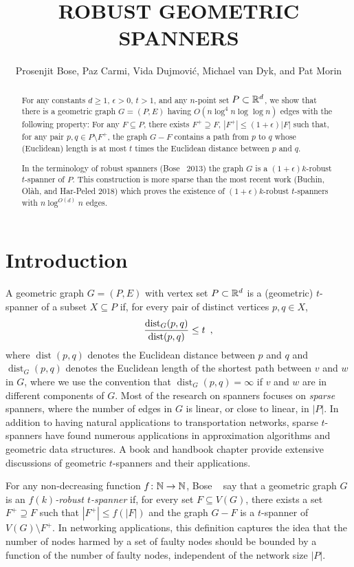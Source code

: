 \documentclass{patmorin}
\title{\MakeUppercase{Robust Geometric Spanners}}
\author{Prosenjit Bose, Paz Carmi, Vida Dujmovi\'c, 
        Michael van Dyk, and Pat Morin}
\date{\DTMnow}
\DeclareMathOperator{\dist}{dist}
\begin{document}
\maketitle


\begin{abstract}
  For any constants $d\ge 1$, $\epsilon >0$, $t>1$, and any $n$-point
  set $P\subset\mathbb{R}^d$, we show that there is a geometric graph $G=(P,E)$
  having $O(n\log^4 n\log\log n)$ edges with the following property:
  For any $F\subseteq P$, there exists $F^+\supseteq F$, $|F^+| \le
  (1+\epsilon)|F|$ such that, for any pair $p,q\in P\setminus F^+$,
  the graph $G-F$ contains a path from $p$ to $q$ whose (Euclidean)
  length is at most $t$ times the Euclidean distance between $p$ and $q$.
  
  In the terminology of robust spanners (Bose \etal\ 2013) the graph $G$
  is a $(1+\epsilon)k$-robust $t$-spanner of $P$. This construction is
  more sparse than the most recent work (Buchin, Ol\`ah, and Har-Peled 2018)
  which proves the existence of $(1+\epsilon)k$-robust $t$-spanners with
  $n\log^{O(d)} n$ edges.
\end{abstract}

\section{Introduction}

A geometric graph $G=(P,E)$ with vertex set $P\subset\mathbb{R}^d$ is a (geometric)
$t$-spanner of a subset $X\subseteq P$ if, for every pair of distinct vertices
$p,q\in X$, 
\begin{equation}
  \frac{\dist_G(p,q)}{\dist(p,q)} \le t \enspace , \eqlabel{spanning-ratio}
\end{equation}
where $\dist(p,q)$ denotes the Euclidean distance between $p$ and $q$ and
$\dist_G(p,q)$ denotes the Euclidean length of the shortest path between
$v$ and $w$ in $G$, where we use the convention that $\dist_G(p,q)=\infty$
if $v$ and $w$ are in different components of $G$.  Most of the research
on spanners focuses on \emph{sparse} spanners, where the number of edges
in $G$ is linear, or close to linear, in $|P|$.  In addition to having
natural applications to transportation networks, sparse $t$-spanners have
found numerous applications in approximation algorithms and geometric
data structures.
A book \cite{ns07} and handbook chapter \cite{e99} provide
extensive discussions of geometric $t$-spanners and their applications.

For any non-decreasing function $f\colon\mathbb{N}\to\mathbb{N}$, Bose \etal\
\cite{bose.dujmovic.ea:robust} say that a geometric graph $G$ is an
\emph{$f(k)$-robust $t$-spanner} if, for every set $F\subseteq V(G)$,
there exists a set $F^+\supseteq F$ such that $|F^+|\le f(|F|)$ and
the graph $G-F$ is a $t$-spanner of $V(G)\setminus F^+$.  In networking
applications, this definition captures the idea that the number of nodes
harmed by a set of faulty nodes should be bounded by a function of the
number of faulty nodes, independent of the network size $|P|$.
\end{document}
